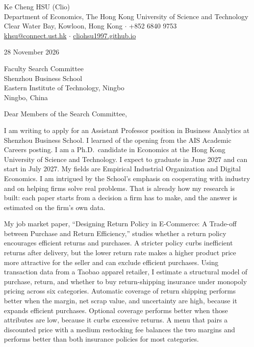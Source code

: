 \documentclass[11pt]{article}
\begin{document}
\begin{flushleft}
Ke Cheng HSU (Clio) \\
Department of Economics, The Hong Kong University of Science and Technology \\
Clear Water Bay, Kowloon, Hong Kong $\cdot$ +852 6840 9753 \\
\href{mailto:khsu@connect.ust.hk}{khsu@connect.ust.hk} $\cdot$ \href{https://cliohsu1997.github.io/}{cliohsu1997.github.io}
\end{flushleft}

28 November 2026

\vspace{0.02em}
Faculty Search Committee \\
Shenzhou Business School \\
Eastern Institute of Technology, Ningbo \\
Ningbo, China

\vspace{0.02em}
Dear Members of the Search Committee,

I am writing to apply for an Assistant Professor position in Business Analytics at Shenzhou Business School. I learned of the opening from the AIS Academic Careers posting. I am a Ph.D.\ candidate in Economics at the Hong Kong University of Science and Technology. I expect to graduate in June 2027 and can start in July 2027. My fields are Empirical Industrial Organization and Digital Economics. I am intrigued by the School's emphasis on cooperating with industry and on helping firms solve real problems. That is already how my research is built: each paper starts from a decision a firm has to make, and the answer is estimated on the firm's own data.

My job market paper, ``Designing Return Policy in E-Commerce: A Trade-off between Purchase and Return Efficiency,'' studies whether a return policy encourages efficient returns and purchases. A stricter policy curbs inefficient returns after delivery, but the lower return rate makes a higher product price more attractive for the seller and can exclude efficient purchases. Using transaction data from a Taobao apparel retailer, I estimate a structural model of purchase, return, and whether to buy return-shipping insurance under monopoly pricing across six categories. Automatic coverage of return shipping performs better when the margin, net scrap value, and uncertainty are high, because it expands efficient purchases. Optional coverage performs better when those attributes are low, because it curbs excessive returns. A menu that pairs a discounted price with a medium restocking fee balances the two margins and performs better than both insurance policies for most categories.
\end{document}
